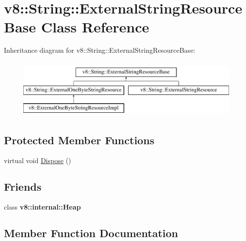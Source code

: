 \hypertarget{classv8_1_1String_1_1ExternalStringResourceBase}{}\section{v8\+:\+:String\+:\+:External\+String\+Resource\+Base Class Reference}
\label{classv8_1_1String_1_1ExternalStringResourceBase}
Inheritance diagram for v8\+:\+:String\+:\+:External\+String\+Resource\+Base\+:\begin{figure}[H]
\begin{center}
\leavevmode
\includegraphics[height=3.000000cm]{classv8_1_1String_1_1ExternalStringResourceBase}
\end{center}
\end{figure}
\subsection*{Protected Member Functions}
\begin{DoxyCompactItemize}
\item 
virtual void \hyperlink{classv8_1_1String_1_1ExternalStringResourceBase_af4720342ae31e1ab4656df3f15d069c0}{Dispose} ()
\end{DoxyCompactItemize}
\subsection*{Friends}
\begin{DoxyCompactItemize}
\item 
\hypertarget{classv8_1_1String_1_1ExternalStringResourceBase_a2d52f783e6ad51ce2c8f89eb1ebc7599}{}class {\bfseries v8\+::internal\+::\+Heap}\label{classv8_1_1String_1_1ExternalStringResourceBase_a2d52f783e6ad51ce2c8f89eb1ebc7599}

\end{DoxyCompactItemize}


\subsection{Member Function Documentation}
\hypertarget{classv8_1_1String_1_1ExternalStringResourceBase_af4720342ae31e1ab4656df3f15d069c0}{}
